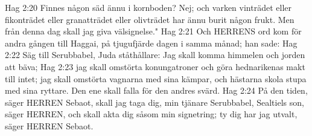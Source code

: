 Hag 2:20  Finnes någon säd ännu i kornboden? Nej; och varken vinträdet eller fikonträdet eller granatträdet eller olivträdet har ännu burit någon frukt. Men från denna dag skall jag giva välsignelse."
Hag 2:21  Och HERRENS ord kom för andra gången till Haggai, på tjugufjärde dagen i samma månad; han sade:
Hag 2:22  Säg till Serubbabel, Juda ståthållare: Jag skall komma himmelen och jorden att bäva;
Hag 2:23  jag skall omstörta konungatroner och göra hednarikenas makt till intet; jag skall omstörta vagnarna med sina kämpar, och hästarna skola stupa med sina ryttare. Den ene skall falla för den andres svärd.
Hag 2:24  På den tiden, säger HERREN Sebaot, skall jag taga dig, min tjänare Serubbabel, Sealtiels son, säger HERREN, och skall akta dig såsom min signetring; ty dig har jag utvalt, säger HERREN Sebaot.


